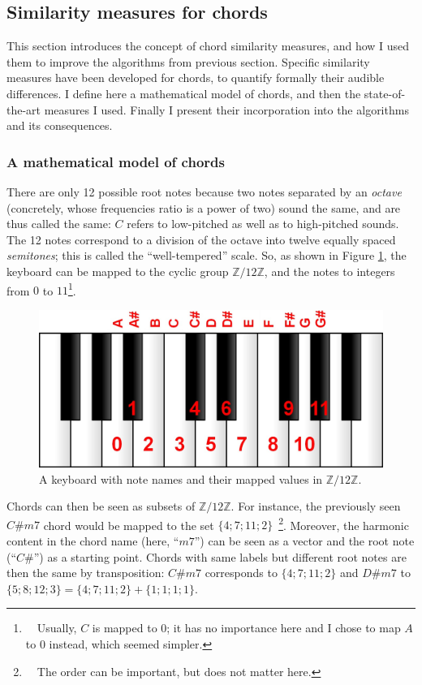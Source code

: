 \documentclass[a4paper,10pt]{article}
\newcommand{\guill}[1]{“#1”}
\begin{document}
\subsection{Similarity measures for chords}

This section introduces the concept of chord similarity measures, and how I used them to improve the algorithms from previous section. Specific similarity measures have been developed for chords, to quantify formally their audible differences. I define here a mathematical model of chords, and then the state-of-the-art measures I used. Finally I present their incorporation into the algorithms and its consequences.

\subsubsection{A mathematical model of chords}
\label{chordmodel}

There are only 12 possible root notes because two notes separated by an \emph{octave} (concretely, whose frequencies ratio is a power of two) sound the same, and are thus called the same: $C$ refers to low-pitched as well as to high-pitched sounds. The 12 notes correspond to a division of the octave into twelve equally spaced \emph{semitones}; this is called the \guill{well-tempered} scale. 
So, as shown in Figure \ref{keyboard}, the keyboard can be mapped to the cyclic group $\mathbb{Z}/12\mathbb{Z}$, and the notes to integers from $0$ to $11$\footnote{~~Usually, $C$ is mapped to 0; it has no importance here and I chose to map $A$ to 0 instead, which seemed simpler.}.

\begin{figure}[h!]
\centering
\includegraphics[width=7
cm]{images/keyboard2.jpg}
\caption{A keyboard with note names and their mapped values in $\mathbb{Z}/12\mathbb{Z}$.\label{keyboard}}
\end{figure}

Chords can then be seen as subsets of $\mathbb{Z}/12\mathbb{Z}$. For instance, the previously seen $C\#m7$ chord would be mapped to the set $\{4;7;11;2\}$~\footnote{~~The order can be important, but does not matter here.}. Moreover, the harmonic content in the chord name (here, \guill{$m7$}) can be seen as a vector and the root note (\guill{$C\#$}) as a starting point. Chords with same labels but different root notes are then the same by transposition: $C\#m7$ corresponds to $\{4;7;11;2\}$ and $D\#m7$ to $\{5;8;12;3\}=\{4;7;11;2\}+\{1;1;1;1\}$.
\end{document}
